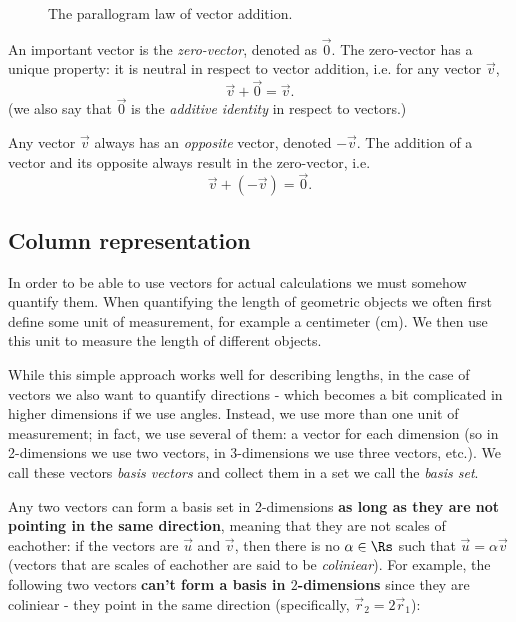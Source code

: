 \begin{figure}[h]
	\centering
	\caption{The parallogram law of vector addition.}
	\label{fig:parallelogram}
\end{figure}

An important vector is the \emph{zero-vector}, denoted as $\vec{0}$. The zero-vector has a unique property: it is neutral in respect to vector addition, i.e. for any vector $\vec{v}$,
\begin{equation}
	\vec{v} + \vec{0} = \vec{v}.
	\label{eq:zero-vector}
\end{equation}
(we also say that $\vec{0}$ is the \emph{additive identity} in respect to vectors.)

Any vector $\vec{v}$ always has an \emph{opposite} vector, denoted $-\vec{v}$. The addition of a vector and its opposite always result in the zero-vector, i.e.
\begin{equation}
	\vec{v} + \left( -\vec{v} \right) = \vec{0}.
	\label{eq:opposite vector}
\end{equation}

\subsection{Column representation}
In order to be able to use vectors for actual calculations we must somehow quantify them. When quantifying the length of geometric objects we often first define some unit of measurement, for example a centimeter (\si{cm}). We then use this unit to measure the length of different objects.

While this simple approach works well for describing lengths, in the case of vectors we also want to quantify directions - which becomes a bit complicated in higher dimensions if we use angles. Instead, we use more than one unit of measurement; in fact, we use several of them: a vector for each dimension (so in 2-dimensions we use two vectors, in 3-dimensions we use three vectors, etc.). We call these vectors \emph{basis vectors} and collect them in a set we call the \emph{basis set}.

Any two vectors can form a basis set in 2-dimensions \textbf{as long as they are not pointing in the same direction}, meaning that they are not scales of eachother: if the vectors are $\vec{u}$ and $\vec{v}$, then there is no $\alpha\in\Rs$ such that $\vec{u}=\alpha\vec{v}$ (vectors that are scales of eachother are said to be \emph{coliniear}). For example, the following two vectors \textbf{can't form a basis in $2$-dimensions} since they are coliniear - they point in the same direction (specifically, $\vec{r}_{2}=2\vec{r}_{1}$):

